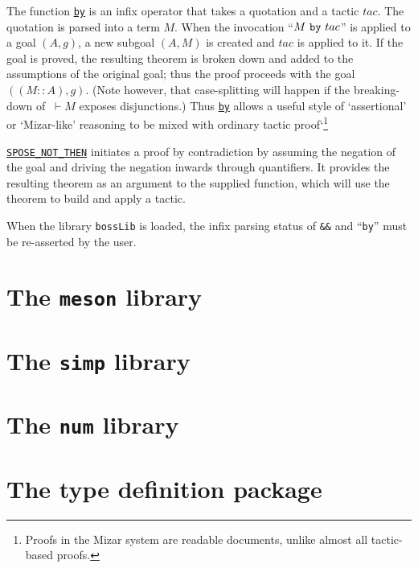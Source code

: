 The function \underline{\tt by} is an infix operator that takes a
quotation and a tactic $tac$. The quotation is parsed into a term
$M$. When the invocation ``$M\ \mbox{\tt by}\ tac$'' is applied to a
goal $(A,g)$, a new subgoal $(A,M)$ is created and $tac$ is applied to
it. If the goal is proved, the resulting theorem is broken down and
added to the assumptions of the original goal; thus the proof proceeds
with the goal $((M::A), g)$. (Note however, that case-splitting will
happen if the breaking-down of $\ \vdash M$ exposes disjunctions.) Thus
\underline{\tt by} allows a useful style  of `assertional' or
`Mizar-like' reasoning to be mixed with ordinary tactic
proof`\footnote{Proofs in the Mizar system are readable documents,
unlike almost all tactic-based proofs.}


\underline{\tt SPOSE\_NOT\_THEN} initiates a proof by
contradiction by assuming the negation of the goal and driving the
negation inwards through quantifiers. It provides the resulting theorem
as an argument to the supplied function, which will use the theorem to
build and apply a tactic.

 When the library \verb+bossLib+ is loaded, the
infix parsing status of \verb+&&+ and ``{\tt by}'' must be re-asserted
by the user.


\section{The {\tt meson} library}
\section{The {\tt simp} library}
\section{The {\tt num} library}

\newpage
\section{The type definition package}\label{types-package}

\begin{center}
\end{center}

